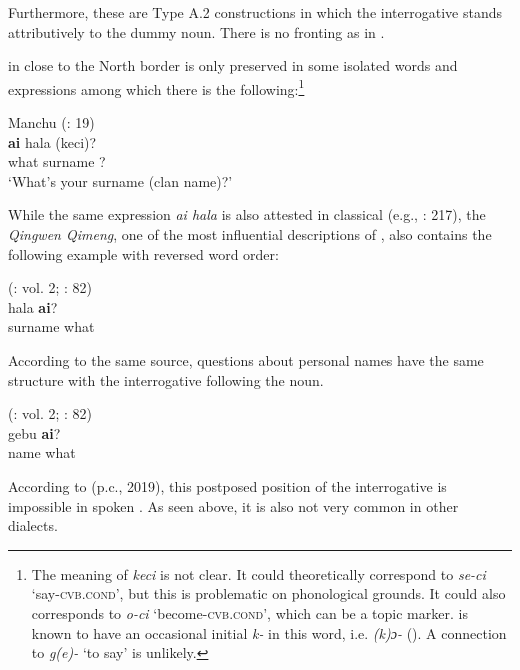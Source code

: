 \documentclass[output=paper,colorlinks,citecolor=brown]{langscibook}
\begin{document}
\noindent Furthermore, these are Type A.2 constructions in which the interrogative stands attributively to the dummy noun. There is no fronting as in .

 in  close to the North  border is only preserved in some isolated words and expressions among which there is the following:\footnote{The meaning of \textit{keci} is not clear. It could theoretically correspond to  \textit{se-ci} ‘say-\textsc{cvb.cond}’, but this is problematic on phonological grounds. It could also corresponds to  \textit{o-ci} ‘become-\textsc{cvb.cond}’, which can be a topic marker.  is known to have an occasional initial \textit{k-} in this word, i.e. \textit{(k)ɔ-} (\citealt{MuYejun1986H}). A connection to  \textit{g(e)-} ‘to say’ is unlikely.}

\ea
    \label{example4.112}
     Manchu (\citealt{ZhaoJie2000H}: 19)\\
    \gll \textbf{ai}			hala		(keci)?\\
    what			surname		?\\
    \glt ‘What’s your surname (clan name)?’
    \z

While the same expression \textit{ai hala} is also attested in classical  (e.g., \citealt{Hauer2007}: 217), the \textit{Qingwen Qimeng}, one of the most influential descriptions of , also contains the following example with reversed word order:
		
\ea
    \label{example4.113}
     (\citealt{Wuge1730}: vol. 2; \citealt{Wylie1855}: 82)\\
    \gll hala		\textbf{ai}?\\
    surname		what\\
    \z

\noindent According to the same source, questions about personal names have the same structure with the interrogative following the noun.

\ea
    \label{example4.114}
     (\citealt{Wuge1730}: vol. 2; \citealt{Wylie1855}: 82)\\
    \gll gebu		\textbf{ai}?\\
    name		what\\
    \z

\noindent According to  (p.c., 2019), this postposed position of the interrogative is impossible in spoken . As seen above, it is also not very common in other  dialects.
\end{document}
